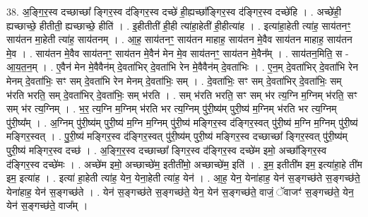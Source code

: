 \documentclass[17pt]{extarticle}
\begin{document}
38. अ॒ङ्गि॒र॒स्व दच्छाच्छा᳚ ङ्गिर॒स्व द॑ङ्गिर॒स्व दच्छे॑ ही॒ह्यच्छा᳚ङ्गिर॒स्व द॑ङ्गिर॒स्व दच्छे॑हि । . अच्छे॑ही॒ ह्यच्छाच्छे॒ हीतीती॒ ह्यच्छाच्छे॒ हीति॑ । . इ॒हीतीती॑ ही॒ही त्या॑हा॒हेती॑ ही॒हीत्या॑ह । . इत्या॑हा॒हेती त्या॑ह॒ साय॑तनꣳ॒॒ साय॑तन मा॒हेती त्या॑ह॒ साय॑तनम् । . आ॒ह॒ साय॑तनꣳ॒॒ साय॑तन माहाह॒ साय॑तन मे॒वैव साय॑तन माहाह॒ साय॑तन मे॒व । . साय॑तन मे॒वैव साय॑तनꣳ॒॒ साय॑तन मे॒वैन॑ मेन मे॒व साय॑तनꣳ॒॒ साय॑तन मे॒वैन᳚म् । . साय॑तन॒मिति॒ स - आ॒य॒त॒न॒म् । . ए॒वैन॑ मेन मे॒वैवैन॑म् दे॒वता॑भिर् दे॒वता॑भि रेन मे॒वैवैन॑म् दे॒वता॑भिः । . ए॒न॒म् दे॒वता॑भिर् दे॒वता॑भि रेन मेनम् दे॒वता॑भिः॒ सꣳ सम् दे॒वता॑भि रेन मेनम् दे॒वता॑भिः॒ सम् । . दे॒वता॑भिः॒ सꣳ सम् दे॒वता॑भिर् दे॒वता॑भिः॒ सम् भ॑रति भरति॒ सम् दे॒वता॑भिर् दे॒वता॑भिः॒ सम् भ॑रति । . सम् भ॑रति भरति॒ सꣳ सम् भ॑र त्य॒ग्नि म॒ग्निम् भ॑रति॒ सꣳ सम् भ॑र त्य॒ग्निम् । . भ॒र॒ त्य॒ग्नि म॒ग्निम् भ॑रति भर त्य॒ग्निम् पु॑री॒ष्य॑म् पुरी॒ष्य॑ म॒ग्निम् भ॑रति भर त्य॒ग्निम् पु॑री॒ष्य᳚म् । . अ॒ग्निम् पु॑री॒ष्य॑म् पुरी॒ष्य॑ म॒ग्नि म॒ग्निम् पु॑री॒ष्य॑ मङ्गिर॒स्व द॑ङ्गिर॒स्वत् पु॑री॒ष्य॑ म॒ग्नि म॒ग्निम् पु॑री॒ष्य॑ मङ्गिर॒स्वत् । . पु॒री॒ष्य॑ मङ्गिर॒स्व द॑ङ्गिर॒स्वत् पु॑री॒ष्य॑म् पुरी॒ष्य॑ मङ्गिर॒स्व दच्छाच्छा᳚ ङ्गिर॒स्वत् पु॑री॒ष्य॑म् पुरी॒ष्य॑ मङ्गिर॒स्व दच्छ॑ । . अ॒ङ्गि॒र॒स्व दच्छाच्छा᳚ ङ्गिर॒स्व द॑ङ्गिर॒स्व दच्छे॑म इमो॒ अच्छा᳚ङ्गिर॒स्व द॑ङ्गिर॒स्व दच्छे॑मः । . अच्छे॑म इमो॒ अच्छाच्छे॑म॒ इतीती॑मो॒ अच्छाच्छे॑म॒ इति॑ । . इ॒म॒ इतीती॑म इम॒ इत्या॑हा॒हे ती॑म इम॒ इत्या॑ह । . इत्या॑ हा॒हेती त्या॑ह॒ येन॒ येना॒हेती त्या॑ह॒ येन॑ । . आ॒ह॒ येन॒ येना॑हाह॒ येन॑ स॒ङ्गच्छ॑ते स॒ङ्गच्छ॑ते॒ येना॑हाह॒ येन॑ स॒ङ्गच्छ॑ते । . येन॑ स॒ङ्गच्छ॑ते स॒ङ्गच्छ॑ते॒ येन॒ येन॑ स॒ङ्गच्छ॑ते॒ वाजं॒ ॅवाजꣳ॑ स॒ङ्गच्छ॑ते॒ येन॒ येन॑ स॒ङ्गच्छ॑ते॒ वाज᳚म् । \newline
\pagebreak
{}
\end{document}

